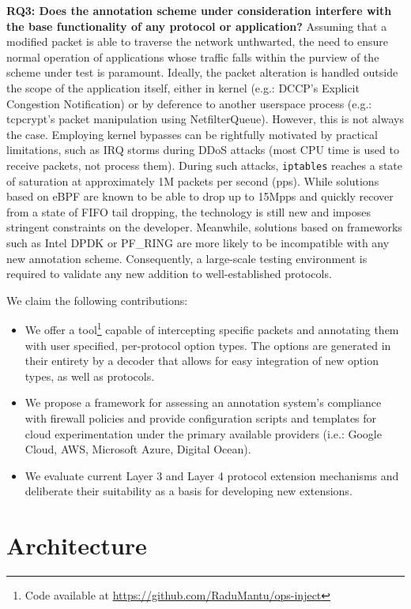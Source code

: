 \textbf{RQ3: Does the annotation scheme under consideration interfere with the base functionality of any protocol or application?}
Assuming that a modified packet is able to traverse the network unthwarted, the need to ensure normal operation of applications whose traffic falls within the purview of the scheme under test is paramount. Ideally, the packet alteration is handled outside the scope of the application itself, either in kernel (e.g.: DCCP's Explicit Congestion Notification) or by deference to another userspace process (e.g.: tcpcrypt's packet manipulation using NetfilterQueue). However, this is not always the case. Employing kernel bypasses can be rightfully motivated by practical limitations, such as IRQ storms during DDoS attacks (most CPU time is used to receive packets, not process them). During such attacks, \texttt{iptables} reaches a state of saturation at approximately 1M packets per second (pps). While solutions based on eBPF are known to be able to drop up to 15Mpps and quickly recover from a state of FIFO tail dropping, the technology is still new and imposes stringent constraints on the developer. Meanwhile, solutions based on frameworks such as Intel DPDK or PF\_RING are more likely to be incompatible with any new annotation scheme. Consequently, a large-scale testing environment is required to validate any new addition to well-established protocols.

We claim the following contributions:
\begin{itemize}
    \item We offer a tool\footnote{Code available at \url{https://github.com/RaduMantu/ops-inject}} capable of intercepting specific packets and annotating them with user specified, per-protocol option types. The options are generated in their entirety by a decoder that allows for easy integration of new option types, as well as protocols.
    \item We propose a framework for assessing an annotation system's compliance with firewall policies and provide configuration scripts and templates for cloud experimentation under the primary available providers (i.e.: Google Cloud, AWS, Microsoft Azure, Digital Ocean).
    \item We evaluate current Layer 3 and Layer 4 protocol extension mechanisms and deliberate their suitability as a basis for developing new extensions.
\end{itemize}

\section{Architecture}


